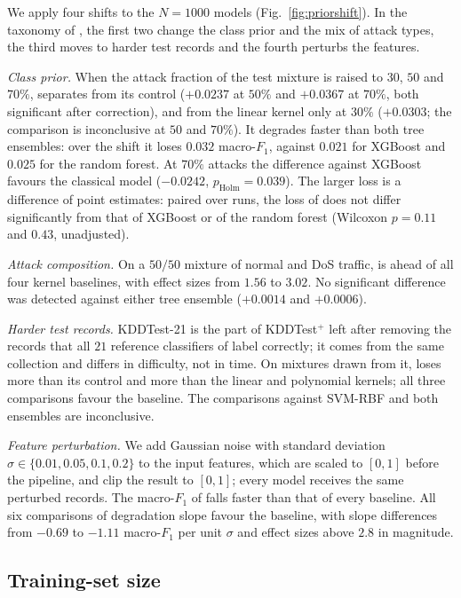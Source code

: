 

We apply four shifts to the $N=1000$ models (Fig.~\ref{fig:priorshift}). In the taxonomy of
\cite{ref33}, the first two change the class prior and the mix of attack types, the third
moves to harder test records and the fourth perturbs the features.

\emph{Class prior.} When the attack fraction of the test mixture is raised to $30$, $50$ and
$70\%$, \QSVM{} separates from its \Zmap{} control ($+0.0237$ at $50\%$ and $+0.0367$ at $70\%$,
both significant after correction), and from the linear kernel only at $30\%$ ($+0.0303$; the
comparison is inconclusive at $50$ and $70\%$). It degrades faster than both tree ensembles: over the shift it loses $0.032$ macro-$F_1$, against $0.021$ for XGBoost and $0.025$
for the random forest. At $70\%$ attacks the difference against XGBoost favours the classical
model ($-0.0242$, $p_{\mathrm{Holm}}=0.039$). The larger loss is a difference of point estimates:
paired over runs, the loss of \QSVM{} does not differ significantly from that of XGBoost or of
the random forest (Wilcoxon $p=0.11$ and $0.43$, unadjusted).

\emph{Attack composition.} On a $50/50$ mixture of normal and DoS traffic, \QSVM{} is ahead of
all four kernel baselines, with effect sizes from $1.56$ to $3.02$. No significant difference
was detected against either tree ensemble ($+0.0014$ and $+0.0006$).

\emph{Harder test records.} KDDTest-21 is the part of KDDTest$^+$ left after removing the
records that all $21$ reference classifiers of \cite{ref4} label correctly; it comes from the
same collection and differs in difficulty, not in time. On mixtures drawn from it, \QSVM{} loses more than its \Zmap{} control
and more than the linear and polynomial kernels; all three comparisons favour the baseline. The
comparisons against SVM-RBF and both ensembles are inconclusive.

\emph{Feature perturbation.} We add Gaussian noise with standard deviation
$\sigma\in\{0.01,0.05,0.1,0.2\}$ to the input features, which are scaled to $[0,1]$ before the
pipeline, and clip the result to $[0,1]$; every model receives the same perturbed records. The
macro-$F_1$ of \QSVM{} falls faster than that of every baseline. All six comparisons of
degradation slope favour the baseline, with slope differences from $-0.69$ to $-1.11$ macro-$F_1$ per unit $\sigma$ and
effect sizes above $2.8$ in magnitude.

\subsection{Training-set size}\label{sec:res-n}

